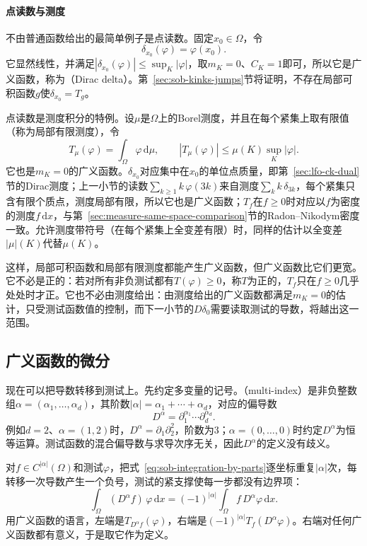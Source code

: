 \paragraph{点读数与测度}
不由普通函数给出的最简单例子是点读数。固定$x_0\in\Omega$，令
\[
 \delta_{x_0}(\varphi)=\varphi(x_0).
\]
它显然线性，并满足$|\delta_{x_0}(\varphi)|\le\sup_K|\varphi|$，取$m_K=0$、$C_K=1$即可，所以它是广义函数，称为（Dirac delta）。第~\ref{sec:sob-kinks-jumps}节将证明，不存在局部可积函数$g$使$\delta_{x_0}=T_g$。

点读数是测度积分的特例。设$\mu$是$\Omega$上的Borel测度，并且在每个紧集上取有限值（称为局部有限测度），令
\[
 T_\mu(\varphi)=\int_\Omega\varphi\,\mathrm d\mu ,\qquad |T_\mu(\varphi)|\le\mu(K)\sup_K|\varphi| .
\]
它也是$m_K=0$的广义函数。$\delta_{x_0}$对应集中在$x_0$的单位点质量，即第~\ref{sec:lfo-ck-dual}节的Dirac测度；上一小节的读数$\sum_{k\ge1}k\,\varphi(3k)$来自测度$\sum_kk\,\delta_{3k}$，每个紧集只含有限个质点，测度局部有限，所以它也是广义函数；$T_f$在$f\ge0$时对应以$f$为密度的测度$f\,\mathrm dx$，与第~\ref{sec:measure-same-space-comparison}节的Radon--Nikodym密度一致。允许测度带符号（在每个紧集上全变差有限）时，同样的估计以全变差$|\mu|(K)$代替$\mu(K)$。

这样，局部可积函数和局部有限测度都能产生广义函数，但广义函数比它们更宽。它不必是正的：若对所有非负测试都有$T(\varphi)\ge0$，称$T$为正的，$T_f$只在$f\ge0$几乎处处时才正。它也不必由测度给出：由测度给出的广义函数都满足$m_K=0$的估计，只受测试函数值的控制，而下一小节的$D\delta_0$需要读取测试的导数，将越出这一范围。

\subsection{广义函数的微分}
\label{sec:sob-distribution-derivative}

现在可以把导数转移到测试上。先约定多变量的记号。（multi-index）是非负整数组$\alpha=(\alpha_1,\ldots,\alpha_d)$，其阶数$|\alpha|=\alpha_1+\cdots+\alpha_d$，对应的偏导数
\[
 D^\alpha=\partial_1^{\alpha_1}\cdots\partial_d^{\alpha_d}.
\]
例如$d=2$、$\alpha=(1,2)$时，$D^\alpha=\partial_1\partial_2^2$，阶数为$3$；$\alpha=(0,\ldots,0)$时约定$D^\alpha$为恒等运算。测试函数的混合偏导数与求导次序无关，因此$D^\alpha$的定义没有歧义。

对$f\in C^{|\alpha|}(\Omega)$和测试$\varphi$，把式~\eqref{eq:sob-integration-by-parts}逐坐标重复$|\alpha|$次，每转移一次导数产生一个负号，测试的紧支撑使每一步都没有边界项：
\begin{equation}
 \int_\Omega(D^\alpha f)\,\varphi\,\mathrm dx=(-1)^{|\alpha|}\int_\Omega f\,D^\alpha\varphi\,\mathrm dx .
 \label{eq:sob-repeated-parts}
\end{equation}
用广义函数的语言，左端是$T_{D^\alpha f}(\varphi)$，右端是$(-1)^{|\alpha|}T_f(D^\alpha\varphi)$。右端对任何广义函数都有意义，于是取它作为定义。

